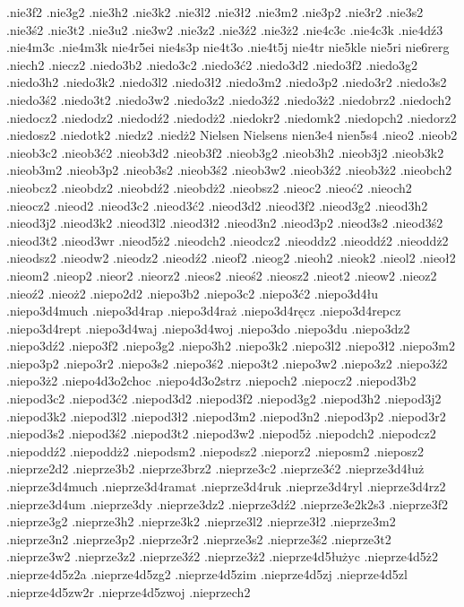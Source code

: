 {{.nie3f2
.nie3g2
.nie3h2
.nie3k2
.nie3l2
.nie3ł2
.nie3m2
.nie3p2
.nie3r2
.nie3s2
.nie3ś2
.nie3t2
.nie3u2
.nie3w2
.nie3z2
.nie3ź2
.nie3ż2
.nie4c3c
.nie4c3k
.nie4dź3
.nie4m3c
.nie4m3k
nie4r5ei
nie4s3p
nie4t3o
.nie4t5j
nie4tr
nie5kle
nie5ri
nie6rerg
.niech2
.niecz2
.niedo3b2
.niedo3c2
.niedo3ć2
.niedo3d2
.niedo3f2
.niedo3g2
.niedo3h2
.niedo3k2
.niedo3l2
.niedo3ł2
.niedo3m2
.niedo3p2
.niedo3r2
.niedo3s2
.niedo3ś2
.niedo3t2
.niedo3w2
.niedo3z2
.niedo3ź2
.niedo3ż2
.niedobrz2
.niedoch2
.niedocz2
.niedodz2
.niedodź2
.niedodż2
.niedokr2
.niedomk2
.niedopch2
.niedorz2
.niedosz2
.niedotk2
.niedz2
.niedż2
Nielsen
Nielsens
nien3e4
nien5s4
.nieo2
.nieob2
.nieob3c2
.nieob3ć2
.nieob3d2
.nieob3f2
.nieob3g2
.nieob3h2
.nieob3j2
.nieob3k2
.nieob3m2
.nieob3p2
.nieob3s2
.nieob3ś2
.nieob3w2
.nieob3ź2
.nieob3ż2
.nieobch2
.nieobcz2
.nieobdz2
.nieobdź2
.nieobdż2
.nieobsz2
.nieoc2
.nieoć2
.nieoch2
.nieocz2
.nieod2
.nieod3c2
.nieod3ć2
.nieod3d2
.nieod3f2
.nieod3g2
.nieod3h2
.nieod3j2
.nieod3k2
.nieod3l2
.nieod3ł2
.nieod3n2
.nieod3p2
.nieod3s2
.nieod3ś2
.nieod3t2
.nieod3wr
.nieod5ż2
.nieodch2
.nieodcz2
.nieoddz2
.nieoddź2
.nieoddż2
.nieodsz2
.nieodw2
.nieodz2
.nieodź2
.nieof2
.nieog2
.nieoh2
.nieok2
.nieol2
.nieoł2
.nieom2
.nieop2
.nieor2
.nieorz2
.nieos2
.nieoś2
.nieosz2
.nieot2
.nieow2
.nieoz2
.nieoź2
.nieoż2
.niepo2d2
.niepo3b2
.niepo3c2
.niepo3ć2
.niepo3d4łu
.niepo3d4much
.niepo3d4rap
.niepo3d4raż
.niepo3d4ręcz
.niepo3d4repcz
.niepo3d4rept
.niepo3d4waj
.niepo3d4woj
.niepo3do
.niepo3du
.niepo3dz2
.niepo3dź2
.niepo3f2
.niepo3g2
.niepo3h2
.niepo3k2
.niepo3l2
.niepo3ł2
.niepo3m2
.niepo3p2
.niepo3r2
.niepo3s2
.niepo3ś2
.niepo3t2
.niepo3w2
.niepo3z2
.niepo3ź2
.niepo3ż2
.niepo4d3o2choc
.niepo4d3o2strz
.niepoch2
.niepocz2
.niepod3b2
.niepod3c2
.niepod3ć2
.niepod3d2
.niepod3f2
.niepod3g2
.niepod3h2
.niepod3j2
.niepod3k2
.niepod3l2
.niepod3ł2
.niepod3m2
.niepod3n2
.niepod3p2
.niepod3r2
.niepod3s2
.niepod3ś2
.niepod3t2
.niepod3w2
.niepod5ż
.niepodch2
.niepodcz2
.niepoddź2
.niepoddż2
.niepodsm2
.niepodsz2
.nieporz2
.nieposm2
.nieposz2
.nieprze2d2
.nieprze3b2
.nieprze3brz2
.nieprze3c2
.nieprze3ć2
.nieprze3d4łuż
.nieprze3d4much
.nieprze3d4ramat
.nieprze3d4ruk
.nieprze3d4ryl
.nieprze3d4rz2
.nieprze3d4um
.nieprze3dy
.nieprze3dz2
.nieprze3dź2
.nieprze3e2k2s3
.nieprze3f2
.nieprze3g2
.nieprze3h2
.nieprze3k2
.nieprze3l2
.nieprze3ł2
.nieprze3m2
.nieprze3n2
.nieprze3p2
.nieprze3r2
.nieprze3s2
.nieprze3ś2
.nieprze3t2
.nieprze3w2
.nieprze3z2
.nieprze3ź2
.nieprze3ż2
.nieprze4d5łużyc
.nieprze4d5ż2
.nieprze4d5z2a
.nieprze4d5zg2
.nieprze4d5zim
.nieprze4d5zj
.nieprze4d5zl
.nieprze4d5zw2r
.nieprze4d5zwoj
.nieprzech2
}}
